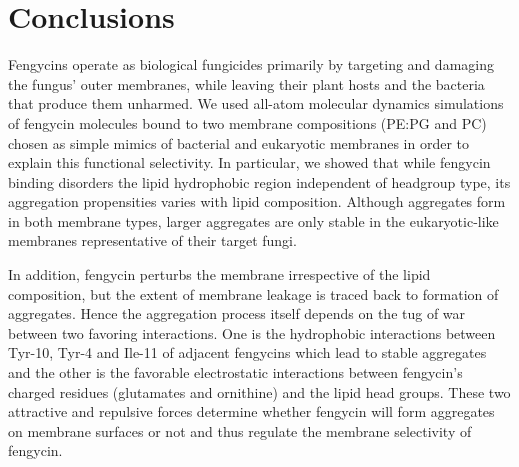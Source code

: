 \section{Conclusions}
\label{s:conclu}

Fengycins operate as biological fungicides primarily by targeting and damaging
the fungus' outer membranes, while leaving their plant hosts and the bacteria
that produce them unharmed.  We used all-atom molecular dynamics simulations of
fengycin molecules bound to two membrane compositions (PE:PG and PC) chosen as
simple mimics of bacterial and eukaryotic membranes in order to explain this
functional selectivity. In particular, we showed that while fengycin binding
disorders the lipid hydrophobic region independent of headgroup type, its
aggregation propensities varies with lipid composition. Although aggregates form
in both membrane types, larger aggregates are only stable in the eukaryotic-like
membranes representative of their target fungi.

In  addition, fengycin perturbs the membrane irrespective of the lipid composition,
but the extent of membrane leakage is traced back to formation of aggregates.
Hence the aggregation process itself depends on the tug of war between two favoring interactions.
One is the hydrophobic interactions between Tyr-10, Tyr-4 and Ile-11 of adjacent fengycins
which lead to stable aggregates and the other is the favorable electrostatic interactions between
fengycin's charged residues (glutamates and ornithine) and the lipid head groups. These two attractive
 and repulsive forces determine whether fengycin will form aggregates on membrane surfaces or not
and thus regulate the membrane selectivity of fengycin.

